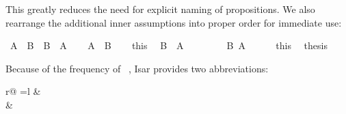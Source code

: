 \begin{isabellebody}
\begin{isamarkuptext}
This greatly reduces the need for explicit naming of propositions.  We also
rearrange the additional inner assumptions into proper order for immediate use:%
\end{isamarkuptext}%
\isamarkuptrue%
\isamarkupfalse%
\ {\isachardoublequoteopen}A\ {\isasymand}\ B\ {\isasymlongrightarrow}\ B\ {\isasymand}\ A{\isachardoublequoteclose}\isanewline
%
\isadelimproof
%
\endisadelimproof
%
\isatagproof
{}\isamarkupfalse%
\isanewline
\ \ \isamarkupfalse%
\ {\isachardoublequoteopen}A\ {\isasymand}\ B{\isachardoublequoteclose}\isanewline
\ \ \isamarkupfalse%
\ this\ \isamarkupfalse%
\ {\isachardoublequoteopen}B\ {\isasymand}\ A{\isachardoublequoteclose}\isanewline
\ \ \isamarkupfalse%
\isanewline
\ \ \ \ \isamarkupfalse%
\ {\isachardoublequoteopen}B{\isachardoublequoteclose}\ {\isachardoublequoteopen}A{\isachardoublequoteclose}\isanewline
\ \ \ \ \isamarkupfalse%
\ this\ \isamarkupfalse%
\ {\isacharquery}thesis\ \isacommand{{\isachardot}{\isachardot}}\isamarkupfalse%
\isanewline
\ \ \isamarkupfalse%
\isanewline
{}\isamarkupfalse%
%
\endisatagproof
{\isafoldproof}%
%
\isadelimproof
%
\endisadelimproof
%
\begin{isamarkuptext}%
\noindent Because of the frequency of ~, Isar provides two abbreviations:
\begin{center}
\begin{tabular}{r@ {\quad=\quad}l}
 &   \\
 &  
\end{tabular}
\end{center}


\end{isamarkuptext}
\end{isabellebody}
